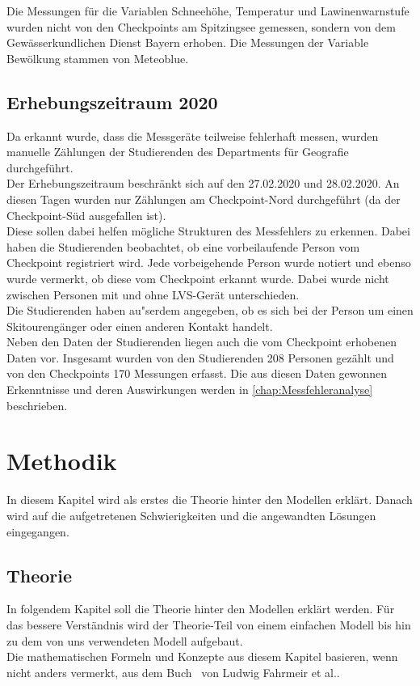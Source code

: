 \documentclass[12pt]{scrreprt}
\begin{document}
\noindent Die Messungen für die Variablen Schneehöhe, Temperatur und Lawinenwarnstufe wurden nicht von den Checkpoints am Spitzingsee gemessen, sondern von dem Gewässerkundlichen Dienst Bayern erhoben. Die Messungen der Variable Bewölkung stammen von Meteoblue. %

\section{Erhebungszeitraum 2020}
Da erkannt wurde, dass die Messgeräte teilweise fehlerhaft messen, wurden manuelle Zählungen der Studierenden des Departments für Geografie durchgeführt. \\
Der Erhebungszeitraum beschränkt sich auf den 27.02.2020 und 28.02.2020. An diesen Tagen wurden nur Zählungen am Checkpoint-Nord durchgeführt (da der Checkpoint-Süd ausgefallen ist). \\
Diese sollen dabei helfen mögliche Strukturen des Messfehlers zu erkennen. Dabei haben die Studierenden beobachtet, ob eine vorbeilaufende Person vom Checkpoint registriert wird. Jede vorbeigehende Person wurde notiert und ebenso wurde vermerkt, ob diese vom Checkpoint erkannt wurde. Dabei wurde nicht zwischen Personen mit und ohne LVS-Gerät unterschieden.\\ Die Studierenden haben au"serdem angegeben, ob es sich bei der Person um einen Skitourengänger oder einen anderen Kontakt handelt. \\
Neben den Daten der Studierenden liegen auch die vom Checkpoint erhobenen Daten vor. Insgesamt wurden von den Studierenden 208 Personen gezählt und von den Checkpoints 170 Messungen erfasst. Die aus diesen Daten gewonnen Erkenntnisse und deren Auswirkungen werden in \autoref{chap:Messfehleranalyse} beschrieben. 

\chapter{Methodik}
In diesem Kapitel wird als erstes die Theorie hinter den Modellen erklärt. Danach wird auf die aufgetretenen Schwierigkeiten und die angewandten Lösungen eingegangen.

\section{Theorie}
In folgendem Kapitel soll die Theorie hinter den Modellen erklärt werden. Für das bessere Verständnis wird der Theorie-Teil von einem einfachen Modell bis hin zu dem von uns verwendeten Modell aufgebaut. \\
Die mathematischen Formeln und Konzepte aus diesem Kapitel basieren, wenn nicht anders vermerkt, aus dem Buch \grqq ~von Ludwig Fahrmeir et al..
\end{document}
